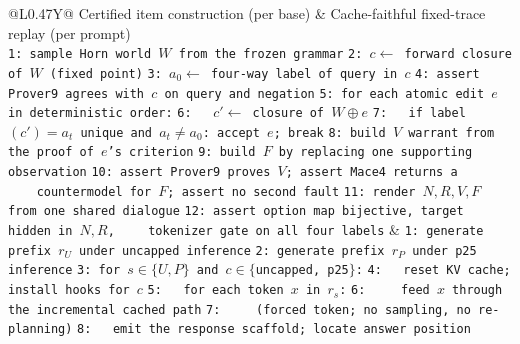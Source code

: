 \documentclass[letterpaper]{article}
\begin{document}
\begin{table}[t]
\centering
\small
\begin{tabularx}{\textwidth}{@{}L{0.47\textwidth}Y@{}}
\toprule
Certified item construction (per base) & Cache-faithful fixed-trace replay (per prompt) \\
\midrule
\texttt{1: sample Horn world $W$ from the frozen grammar} \newline
\texttt{2: $c \leftarrow$ forward closure of $W$ (fixed point)} \newline
\texttt{3: $a_0 \leftarrow$ four-way label of query in $c$} \newline
\texttt{4: assert Prover9 agrees with $c$ on query and negation} \newline
\texttt{5: for each atomic edit $e$ in deterministic order:} \newline
\texttt{6: \ \ $c' \leftarrow$ closure of $W \oplus e$} \newline
\texttt{7: \ \ if label$(c')=a_t$ unique and $a_t \neq a_0$: accept $e$; break} \newline
\texttt{8: build $V$ warrant from the proof of $e$'s criterion} \newline
\texttt{9: build $F$ by replacing one supporting observation} \newline
\texttt{10: assert Prover9 proves $V$; assert Mace4 returns a} \newline
\texttt{\ \ \ \ countermodel for $F$; assert no second fault} \newline
\texttt{11: render $N,R,V,F$ from one shared dialogue} \newline
\texttt{12: assert option map bijective, target hidden in $N,R$,} \newline
\texttt{\ \ \ \ tokenizer gate on all four labels}
&
\texttt{1: generate prefix $r_U$ under uncapped inference} \newline
\texttt{2: generate prefix $r_P$ under p25 inference} \newline
\texttt{3: for $s \in \{U,P\}$ and $c \in \{$uncapped, p25$\}$:} \newline
\texttt{4: \ \ reset KV cache; install hooks for $c$} \newline
\texttt{5: \ \ for each token $x$ in $r_s$:} \newline
\texttt{6: \ \ \ \ feed $x$ through the incremental cached path} \newline
\texttt{7: \ \ \ \ (forced token; no sampling, no re-planning)} \newline
\texttt{8: \ \ emit the response scaffold; locate answer position} \newline

\end{tabularx}
\end{table}
\end{document}
